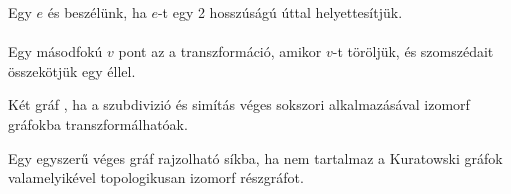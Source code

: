 \begin{frame}
\begin{tcolorbox}[title={Def.: Szubdivízió, Simítás}]
Egy $e$ és  beszélünk, ha $e$-t egy 2 hosszúságú úttal helyettesítjük.\\
\\
Egy másodfokú $v$ pont  az a transzformáció, amikor $v$-t töröljük, és szomszédait összekötjük egy éllel.
\end{tcolorbox}

\begin{tcolorbox}[title={Def.: Topologikus izomorfia}]
Két gráf , ha a szubdivizió és simítás véges sokszori alkalmazásával izomorf gráfokba transzformálhatóak.
\end{tcolorbox}

\begin{tcolorbox}[title={Tétel: Kuratowski tétel}]
Egy egyszerű véges gráf  rajzolható síkba, ha nem tartalmaz a Kuratowski gráfok valamelyikével topologikusan izomorf részgráfot.
\end{tcolorbox}
\end{frame}


